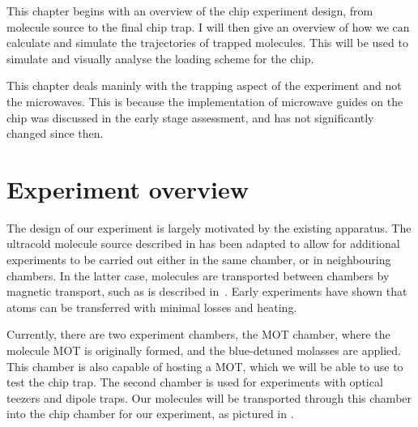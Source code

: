 This chapter begins with an overview of the chip experiment design, from
molecule source to the final chip trap. I will then give an overview of how we
can calculate and simulate the trajectories of trapped \CaF{} molecules. This
will be used to simulate and visually analyse the loading scheme for the chip.

This chapter deals maninly with the trapping aspect of the experiment and not
the microwaves. This is because the implementation of microwave guides on the
chip was discussed in the early stage assessment, and has not significantly
changed since then.

\section{Experiment overview}

%
The design of our experiment is largely motivated by the existing apparatus.
The ultracold molecule source described in  has been
adapted to allow for additional experiments to be carried out either in the
same chamber, or in neighbouring chambers. In the latter case, molecules are
transported between chambers by magnetic transport, such as is described
in~\cite{Lewandowski2003}. Early experiments have shown that \Rb{} atoms can be
transferred with minimal losses and heating.

Currently, there are two experiment chambers, the MOT chamber, where the
molecule MOT is originally formed, and the blue-detuned molasses are applied.
This chamber is also capable of hosting a \Rb{} MOT, which we will be able to
use to test the chip trap. The second chamber is used for experiments with
optical teezers and dipole traps. Our molecules will be transported through
this chamber into the chip chamber for our experiment, as pictured in
.


